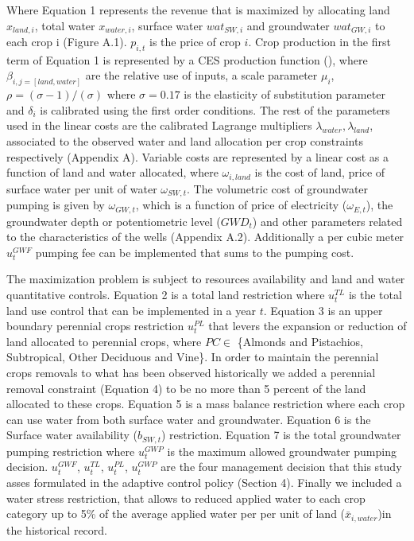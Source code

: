 \documentclass[11pt,a4paper]{article}
\begin{document}
Where Equation 1 represents the revenue that is maximized by allocating land $x_{land,i}$, total water $x_{water,i}$, surface water $wat_{SW,i}$ and groundwater $wat_{GW,i}$ to each crop i (Figure A.1). $p_{i,t}$ is the price of crop $i$. Crop production in the first term of Equation 1 is represented by a CES production function (\cite{debertin_agricultural_2012}), where $\beta_{i,j=[land,water]}$ are the relative use of inputs, a scale parameter $\mu_{i}$, $\rho = (\sigma-1)/(\sigma)$ where $\sigma = 0.17$ is the elasticity of substitution parameter and $\delta_{i}$ is calibrated using the first order conditions. The rest of the parameters used in the linear costs are the calibrated Lagrange multipliers $\lambda_{water},\lambda_{land}$, associated to the observed water and land allocation per crop constraints respectively (Appendix A). Variable costs are represented by a linear cost as a function of land and water allocated, where $\omega_{i,land}$ is the cost of land, price of surface water per unit of water $\omega_{SW,t}$. The volumetric cost of groundwater pumping is given by $\omega_{GW,t}$, which is a function of price of electricity ($\omega_{E,t}$), the groundwater depth or potentiometric level ($GWD_t$) and other parameters related to the characteristics of the wells (Appendix A.2). Additionally a per cubic meter $u^{GWF}_{t}$ pumping fee can be implemented that sums to the pumping cost.

The maximization problem is subject to resources availability and land and water quantitative controls. Equation 2 is a total land restriction where $u^{TL}_{t}$ is the total land use control that can be implemented in a year $t$. Equation 3 is an upper boundary perennial crops restriction $u^{PL}_{t}$ that levers the expansion or reduction of land allocated to perennial crops, where $PC \in$ \{Almonds and Pistachios, Subtropical, Other Deciduous and Vine\}. In order to maintain the perennial crops removals to what has been observed historically we added a perennial removal constraint (Equation 4) to be no more than 5 percent of the land allocated to these crops. Equation 5 is a mass balance restriction where each crop can use water from both surface water and groundwater. Equation 6 is the Surface water availability ($b_{SW,t}$) restriction. Equation 7 is the total groundwater pumping restriction where $u^{GWP}_{t}$ is the maximum allowed groundwater pumping decision. $u^{GWF}_{t}$, $u^{TL}_{t}$, $u^{PL}_{t}$, $u^{GWP}_{t}$ are the four management decision that this study asses formulated in the adaptive control policy (Section  4). Finally we included a water stress restriction, that allows to reduced applied water to each crop category up to 5\% of the average applied water per per unit of land ($\bar{x}_{i,water}$)in the historical record.
\end{document}
